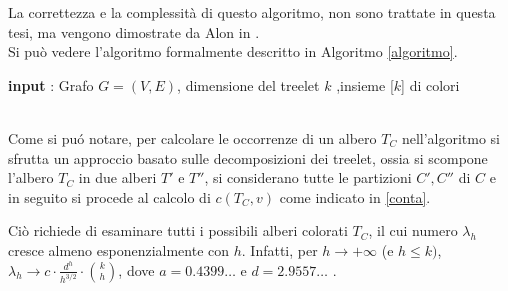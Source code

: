  La correttezza e la complessit\`a di questo algoritmo, non sono trattate in questa tesi, ma vengono dimostrate da Alon in \cite{alon1995color}.\\
 Si pu\`o vedere l'algoritmo formalmente  descritto in Algoritmo \ref{algoritmo}.\\


\begin{algorithm}[H]
	\caption{Algoritmo per il conteggio del numero di occorrenze di $ k $-treelet ben-colorati in $ G $}
	\label{algoritmo}
	\SetAlgoLined
 	\textbf{input} : Grafo $ G =(V,E) $, dimensione del treelet $ k $ ,insieme [$ k $] di colori\;	
 			
\end{algorithm}\mbox{}\\

Come si pu\'o notare, per calcolare le occorrenze di un albero $ T_C $ nell'algoritmo si sfrutta un approccio basato sulle decomposizioni dei treelet, ossia si scompone l'albero $ T_C $ in due alberi $ T' $ e $ T'' $, si considerano tutte le partizioni $ C',C''$ di $C$ e in seguito si procede al calcolo di $ c(T_C,v) $ come indicato in \eqref{conta}.

Ciò richiede di esaminare tutti i possibili alberi colorati $T_C$, il cui numero $\lambda_h$ cresce almeno esponenzialmente con $h$. Infatti, per $h \to +\infty$ (e $h \le k)$, $\lambda_h \to c \cdot \frac{d^h}{h^{3/2}} \cdot \binom{k}{h}$, dove $a=0.4399\dots$ e $d=2.9557\dots$ \cite{knuth1969art}.

